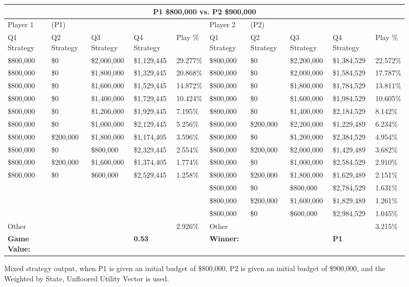 \documentclass[11pt]{article}
\begin{document}
\begin{figure}
\tiny
\begin{tabular}{ |p{1.0cm}p{1.0cm}p{1.0cm}p{2.0cm}|p{1.0cm}||p{1.0cm}p{1.0cm}p{1.0cm}p{2.0cm}|p{1.0cm}|}
\hline
\multicolumn{10}{|c|}{P1 \$800,000 vs. P2 \$900,000} \\
\hline
Player 1 & (P1) & & & & Player 2 & (P2) & & & \\
\hline
Q1 Strategy & Q2 Strategy & Q3 Strategy & Q4 Strategy  &  Play \% & Q1 Strategy & Q2 Strategy & Q3 Strategy & Q4 Strategy  &  Play \%\\
\hline
\$800,000 & \$0 & \$2,000,000 & \$1,129,445 & 29.277\% & \$800,000 & \$0 & \$2,200,000 & \$1,384,529 & 22.572\% \\
\$800,000 & \$0 & \$1,800,000 & \$1,329,445 & 20.868\% & \$800,000 & \$0 & \$2,000,000 & \$1,584,529 & 17.787\% \\
\$800,000 & \$0 & \$1,600,000 & \$1,529,445 & 14.872\% & \$800,000 & \$0 & \$1,800,000 & \$1,784,529 & 13.811\% \\
\$800,000 & \$0 & \$1,400,000 & \$1,729,445 & 10.424\% & \$800,000 & \$0 & \$1,600,000 & \$1,984,529 & 10.605\% \\
\$800,000 & \$0 & \$1,200,000 & \$1,929,445 & 7.195\% & \$800,000 & \$0 & \$1,400,000 & \$2,184,529 & 8.142\% \\
\$800,000 & \$0 & \$1,000,000 & \$2,129,445 & 5.256\% & \$800,000 & \$200,000 & \$2,200,000 & \$1,229,489 & 6.234\% \\
\$800,000 & \$200,000 & \$1,800,000 & \$1,174,405 & 3.596\% & \$800,000 & \$0 & \$1,200,000 & \$2,384,529 & 4.954\% \\
\$800,000 & \$0 & \$800,000 & \$2,329,445 & 2.554\% & \$800,000 & \$200,000 & \$2,000,000 & \$1,429,489 & 3.682\% \\
\$800,000 & \$200,000 & \$1,600,000 & \$1,374,405 & 1.774\% & \$800,000 & \$0 & \$1,000,000 & \$2,584,529 & 2.910\% \\
\$800,000 & \$0 & \$600,000 & \$2,529,445 & 1.258\% & \$800,000 & \$200,000 & \$1,800,000 & \$1,629,489 & 2.151\% \\
&  &  &  &  & \$800,000 & \$0 & \$800,000 & \$2,784,529 & 1.631\% \\
&  &  &  &  & \$800,000 & \$200,000 & \$1,600,000 & \$1,829,489 & 1.261\% \\
&  &  &  &  & \$800,000 & \$0 & \$600,000 & \$2,984,529 & 1.045\% \\
\hline
Other &  &  &  & 2.926\% & Other &  &  &  & 3.215\% \\
\hline
\small \textbf{Game Value:} &&& \small \textbf{0.53} && \small \textbf{Winner:} &&& \small \textbf{P1}&\\
\hline
\end{tabular}
\caption{Mixed strategy output, when P1 is given an initial budget of \$800,000, P2 is given an initial budget of \$900,000, and the Weighted by State, Unfloored Utility Vector is used.}
\label{8v9table.5}
\end{figure}
\end{document}
